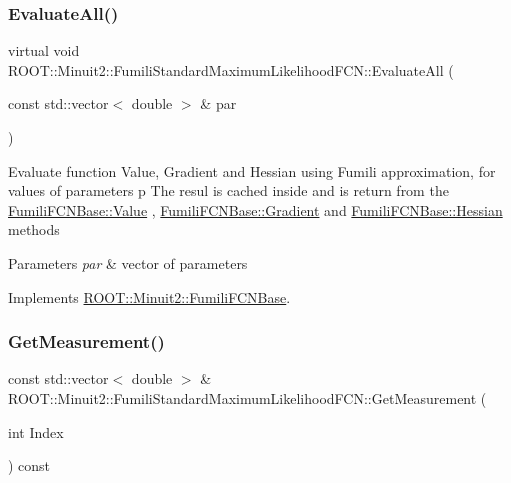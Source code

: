 \subsubsection{\texorpdfstring{EvaluateAll()}{EvaluateAll()}\hspace{0.1cm}{\footnotesize\ttfamily [3/3]}}
{\footnotesize\ttfamily virtual void R\+O\+O\+T\+::\+Minuit2\+::\+Fumili\+Standard\+Maximum\+Likelihood\+F\+C\+N\+::\+Evaluate\+All (\begin{DoxyParamCaption}\item[{const std\+::vector$<$ double $>$ \&}]{par }\end{DoxyParamCaption})\hspace{0.3cm}{\ttfamily [virtual]}}

Evaluate function Value, Gradient and Hessian using Fumili approximation, for values of parameters p The resul is cached inside and is return from the \mbox{\hyperlink{classROOT_1_1Minuit2_1_1FumiliFCNBase_a221dacee0ccde747a271a0cecd759f98}{Fumili\+F\+C\+N\+Base\+::\+Value}} , \mbox{\hyperlink{classROOT_1_1Minuit2_1_1FumiliFCNBase_ad226939ea2e83f754b5a6afc30876d3e}{Fumili\+F\+C\+N\+Base\+::\+Gradient}} and \mbox{\hyperlink{classROOT_1_1Minuit2_1_1FumiliFCNBase_ade134d8c6613393e942ef98d445db376}{Fumili\+F\+C\+N\+Base\+::\+Hessian}} methods


\begin{DoxyParams}{Parameters}
{\em par} & vector of parameters \\
\hline
\end{DoxyParams}


Implements \mbox{\hyperlink{classROOT_1_1Minuit2_1_1FumiliFCNBase_a0741bb4a7405cc33ab60583472a189cb}{R\+O\+O\+T\+::\+Minuit2\+::\+Fumili\+F\+C\+N\+Base}}.

\mbox{\label{classROOT_1_1Minuit2_1_1FumiliStandardMaximumLikelihoodFCN_a6eb1fbf9c0c13057e080f8ed7af7a1c2}} 
\subsubsection{\texorpdfstring{GetMeasurement()}{GetMeasurement()}\hspace{0.1cm}{\footnotesize\ttfamily [1/3]}}
{\footnotesize\ttfamily const std\+::vector$<$ double $>$ \& R\+O\+O\+T\+::\+Minuit2\+::\+Fumili\+Standard\+Maximum\+Likelihood\+F\+C\+N\+::\+Get\+Measurement (\begin{DoxyParamCaption}\item[{int}]{Index }\end{DoxyParamCaption}) const\hspace{0.3cm}{\ttfamily [virtual]}}

